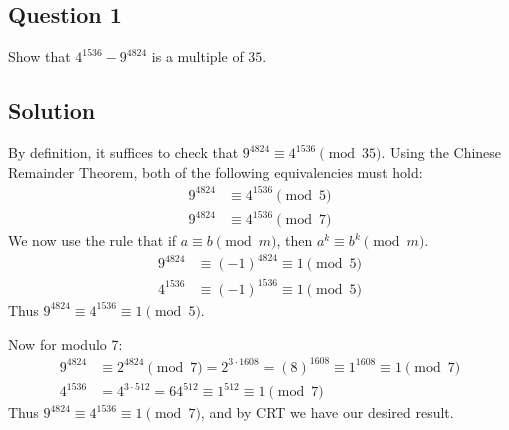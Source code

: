 \documentclass{article}
\begin{document}
\subsection*{Question 1}
    Show that $4^{1536} - 9^{4824}$ is a multiple of $35$.

\subsection*{Solution}
    By definition, it suffices to check that $9^{4824} \equiv 4^{1536} \pmod{35}$. Using the Chinese Remainder Theorem, both of the following equivalencies must hold:
    \begin{align*}
        9^{4824} &\equiv 4^{1536} \pmod{5} \\
        9^{4824} &\equiv 4^{1536} \pmod{7}
    \end{align*}
    We now use the rule that if $a \equiv b \pmod{m}$, then $a^{k} \equiv b^{k} \pmod{m}$.
    \begin{align*}
        9^{4824} &\equiv (-1)^{4824} \equiv 1 \pmod{5} \\
        4^{1536} &\equiv (-1)^{1536} \equiv 1 \pmod{5}
    \end{align*}
    Thus $9^{4824} \equiv 4^{1536} \equiv 1 \pmod{5}$.
    
    Now for modulo 7:
    \begin{align*}
        9^{4824} &\equiv 2^{4824} \pmod{7} = 2^{3 \cdot 1608} = (8)^{1608} \equiv 1^{1608} \equiv 1 \pmod{7} \\
        4^{1536} &= 4^{3 \cdot 512} = 64^{512} \equiv 1^{512} \equiv 1 \pmod{7}
    \end{align*}
    Thus $9^{4824} \equiv 4^{1536} \equiv 1 \pmod{7}$, and by CRT we have our desired result.
\end{document}
